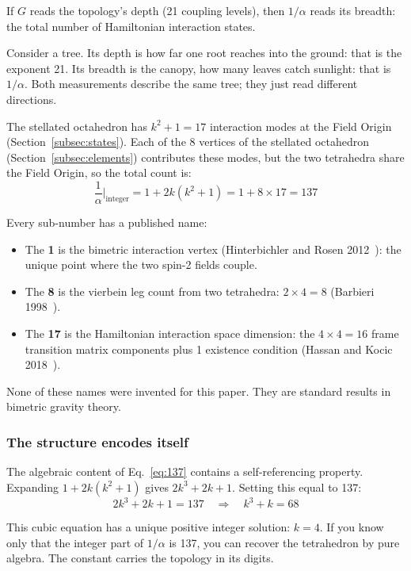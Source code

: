 \documentclass[aps,prd,preprint,superscriptaddress,showpacs,preprintnumbers,amsmath,amssymb,nofootinbib]{revtex4-2}
\begin{document}
If $G$ reads the topology's depth (21 coupling levels), then $1/\alpha$ reads its breadth: the total number of Hamiltonian interaction states.

Consider a tree. Its depth is how far one root reaches into the ground: that is the exponent 21. Its breadth is the canopy, how many leaves catch sunlight: that is $1/\alpha$. Both measurements describe the same tree; they just read different directions.

The stellated octahedron has $k^2 + 1 = 17$ interaction modes at the Field Origin (Section~\ref{subsec:states}). Each of the 8 vertices of the stellated octahedron (Section~\ref{subsec:elements}) contributes these modes, but the two tetrahedra share the Field Origin, so the total count is:
\begin{equation}
\frac{1}{\alpha}\bigg|_{\text{integer}} = 1 + 2k(k^2 + 1) = 1 + 8 \times 17 = 137
\label{eq:137}
\end{equation}

Every sub-number has a published name:
\begin{itemize}
\item The \textbf{1} is the bimetric interaction vertex (Hinterbichler and Rosen 2012~\cite{hinterbichler2012}): the unique point where the two spin-2 fields couple.
\item The \textbf{8} is the vierbein leg count from two tetrahedra: $2 \times 4 = 8$ (Barbieri 1998~\cite{barbieri1998}).
\item The \textbf{17} is the Hamiltonian interaction space dimension: the $4 \times 4 = 16$ frame transition matrix components plus 1 existence condition (Hassan and Kocic 2018~\cite{hassankocic2018}).
\end{itemize}

None of these names were invented for this paper. They are standard results in bimetric gravity theory.

\subsubsection*{The structure encodes itself}

The algebraic content of Eq.~\eqref{eq:137} contains a self-referencing property. Expanding $1 + 2k(k^2 + 1)$ gives $2k^3 + 2k + 1$. Setting this equal to 137:
\begin{equation}
2k^3 + 2k + 1 = 137 \quad \Longrightarrow \quad k^3 + k = 68
\end{equation}

This cubic equation has a unique positive integer solution: $k = 4$. If you know only that the integer part of $1/\alpha$ is 137, you can recover the tetrahedron by pure algebra. The constant carries the topology in its digits.
\end{document}
